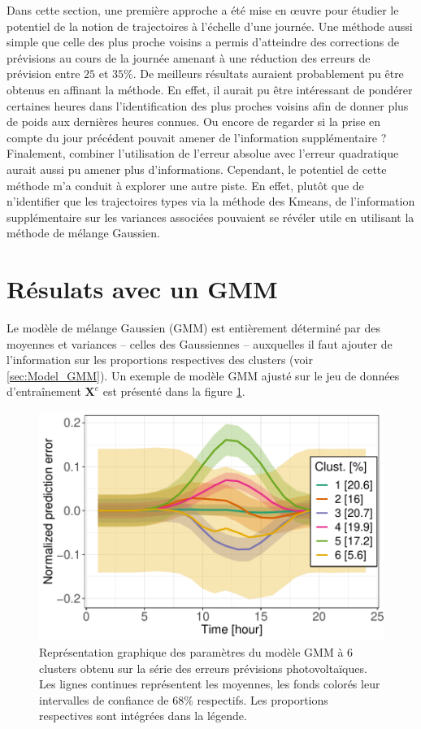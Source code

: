 \documentclass[12pt, french]{report}
\begin{document}
Dans cette section, une première approche a été mise en œuvre pour étudier le potentiel de la notion de trajectoires à l'échelle d'une journée. Une méthode aussi simple que celle des plus proche voisins a permis d'atteindre des corrections de prévisions au cours de la journée amenant à une réduction des erreurs de prévision entre $25$ et $35\%$. De meilleurs résultats auraient probablement pu être obtenus en affinant la méthode. En effet, il aurait pu être intéressant de pondérer certaines heures dans l'identification des plus proches voisins afin de donner plus de poids aux dernières heures connues. Ou encore de regarder si la prise en compte du jour précédent pouvait amener de l'information supplémentaire ? Finalement, combiner l'utilisation de l'erreur absolue avec l'erreur quadratique aurait aussi pu amener plus d'informations. Cependant, le potentiel de cette méthode m'a conduit à explorer une autre piste. En effet, plutôt que de n'identifier que les trajectoires types via la méthode des Kmeans, de l'information supplémentaire sur les variances associées pouvaient se révéler utile en utilisant la méthode de mélange Gaussien.


\section{Résulats avec un GMM}
\label{sec:PV_GMM}
Le modèle de mélange Gaussien (GMM) est entièrement déterminé par des moyennes et variances -- celles des Gaussiennes -- auxquelles il faut ajouter de l'information sur les proportions respectives des clusters (voir \ref{sec:Model_GMM}). Un exemple de modèle GMM ajusté sur le jeu de données d'entraînement $\bm{X}^e$ est présenté dans la figure \ref{fig:PV_GMM_MeanVarProp}.

\begin{figure}[htbp]
	\centering
	\includegraphics[width = 0.75 \linewidth]{Images/PV/GMM/GMM_MeansVars_6_dim24.pdf}
	\caption{Représentation graphique des paramètres du modèle GMM à 6 clusters obtenu sur la série des erreurs prévisions photovoltaïques. Les lignes continues représentent les moyennes, les fonds colorés leur intervalles de confiance de $68 \%$ respectifs. Les proportions respectives sont intégrées dans la légende.}
	\label{fig:PV_GMM_MeanVarProp}
\end{figure}
\end{document}
